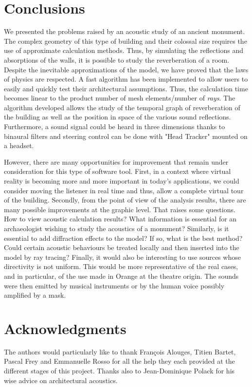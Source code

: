 \documentclass[AMA,STIX1COL]{WileyNJD-v2}
\begin{document}
\section{Conclusions}

We presented the problems raised by an acoustic study of an ancient monument. The complex geometry of this type of building and their colossal size requires the use of approximate calculation methods. Thus, by simulating the reflections and absorptions of the walls, it is possible to study the reverberation of a room. Despite the inevitable approximations of the model, we have proved that the laws of physics are respected. A fast algorithm has been implemented to allow users to easily and quickly test their architectural assumptions. Thus, the calculation time becomes linear to the product number of mesh elements/number of \textit{rays}. The algorithm developed allows the study of the temporal graph of reverberation of the building as well as the position in space of the various sound reflections. Furthermore, a sound signal could be heard in three dimensions thanks to binaural filters and steering control can be done with "Head Tracker" mounted on a headset.

However, there are many opportunities for improvement that remain under consideration for this type of software tool. First, in a context where virtual reality is becoming more and more important in today's applications, we could consider moving the listener in real time and thus, allow a complete virtual tour of the building. Secondly, from the point of view of the analysis results, there are many possible improvements at the graphic level. That raises some questions. How to view acoustic calculation results? What information is essential for an archaeologist wishing to study the acoustics of a monument? Similarly, is it essential to add diffraction effects to the model? If so, what is the best method? Could certain acoustic behaviours be treated locally and then inserted into the model by ray tracing? Finally, it would also be interesting to use sources whose directivity is not uniform. This would be more representative of the real cases, and in particular, of the use made in Orange at the theatre origin. The sounds were then emitted by musical instruments or by the human voice possibly amplified by a mask.



\section*{Acknowledgments}
The authors would particularly like to thank Fran\c{c}ois Alouges, Titien Bartet, Pascal Frey and Emmanuelle Rosso for all the help they each provided at the different stages of this project. Thanks also to Jean-Dominique Polack for his wise advice on architectural acoustics.
\end{document}

